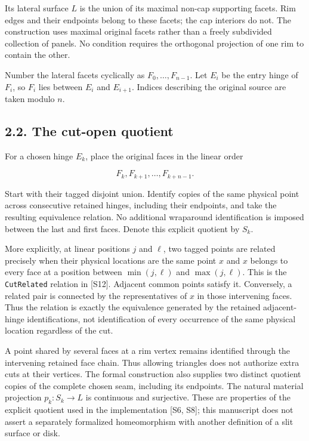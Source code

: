 \documentclass[
  11pt,
  letterpaper,
]{article}
\begin{document}
Its lateral surface \(L\) is the union of its maximal non-cap supporting
facets. Rim edges and their endpoints belong to these facets; the cap
interiors do not. The construction uses maximal original facets rather
than a freely subdivided collection of panels. No condition requires the
orthogonal projection of one rim to contain the other.

Number the lateral facets cyclically as \(F_0,\ldots,F_{n-1}\). Let
\(E_i\) be the entry hinge of \(F_i\), so \(F_i\) lies between \(E_i\)
and \(E_{i+1}\). Indices describing the original source are taken modulo
\(n\).

\subsection{2.2. The cut-open quotient}\label{the-cut-open-quotient}

For a chosen hinge \(E_k\), place the original faces in the linear order

\[
F_k,F_{k+1},\ldots,F_{k+n-1}.
\]

Start with their tagged disjoint union. Identify copies of the same
physical point across consecutive retained hinges, including their
endpoints, and take the resulting equivalence relation. No additional
wraparound identification is imposed between the last and first faces.
Denote this explicit quotient by \(S_k\).

More explicitly, at linear positions \(j\) and \(\ell\), two tagged
points are related precisely when their physical locations are the same
point \(x\) and \(x\) belongs to every face at a position between
\(\min(j,\ell)\) and \(\max(j,\ell)\). This is the \texttt{CutRelated}
relation in {[}S12{]}. Adjacent common points satisfy it. Conversely, a
related pair is connected by the representatives of \(x\) in those
intervening faces. Thus the relation is exactly the equivalence
generated by the retained adjacent-hinge identifications, not
identification of every occurrence of the same physical location
regardless of the cut.

A point shared by several faces at a rim vertex remains identified
through the intervening retained face chain. Thus allowing triangles
does not authorize extra cuts at their vertices. The formal construction
also supplies two distinct quotient copies of the complete chosen seam,
including its endpoints. The natural material projection
\(p_k:S_k\to L\) is continuous and surjective. These are properties of
the explicit quotient used in the implementation {[}S6, S8{]}; this
manuscript does not assert a separately formalized homeomorphism with
another definition of a slit surface or disk.
\end{document}
